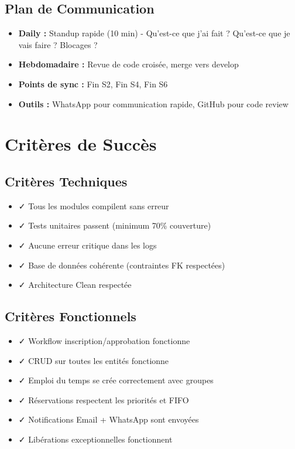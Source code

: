 \documentclass[12pt,a4paper]{article}
\begin{document}
\subsection{Plan de Communication}

\begin{itemize}
    \item \textbf{Daily :} Standup rapide (10 min) - Qu'est-ce que j'ai fait ? Qu'est-ce que je vais faire ? Blocages ?
    \item \textbf{Hebdomadaire :} Revue de code croisée, merge vers develop
    \item \textbf{Points de sync :} Fin S2, Fin S4, Fin S6
    \item \textbf{Outils :} WhatsApp pour communication rapide, GitHub pour code review
\end{itemize}

\newpage

\section{Critères de Succès}

\subsection{Critères Techniques}

\begin{itemize}
    \item ✓ Tous les modules compilent sans erreur
    \item ✓ Tests unitaires passent (minimum 70\% couverture)
    \item ✓ Aucune erreur critique dans les logs
    \item ✓ Base de données cohérente (contraintes FK respectées)
    \item ✓ Architecture Clean respectée
\end{itemize}

\subsection{Critères Fonctionnels}

\begin{itemize}
    \item ✓ Workflow inscription/approbation fonctionne
    \item ✓ CRUD sur toutes les entités fonctionne
    \item ✓ Emploi du temps se crée correctement avec groupes
    \item ✓ Réservations respectent les priorités et FIFO
    \item ✓ Notifications Email + WhatsApp sont envoyées
    \item ✓ Libérations exceptionnelles fonctionnent
\end{itemize}
\end{document}
